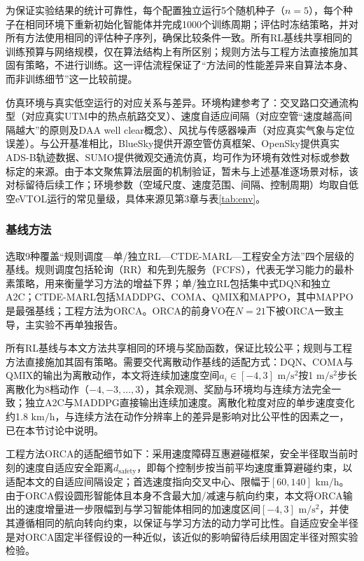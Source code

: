 \documentclass[12pt,a4paper,UTF8]{ctexart}
\begin{document}
为保证实验结果的统计可靠性，每个配置独立运行5个随机种子（$n=5$），每个种子在相同环境下重新初始化智能体并完成1000个训练周期；评估时冻结策略，并对所有方法使用相同的评估种子序列，确保比较条件一致。所有RL基线共享相同的训练预算与网络规模，仅在算法结构上有所区别；规则方法与工程方法直接施加其固有策略，不进行训练。这一评估流程保证了“方法间的性能差异来自算法本身、而非训练细节”这一比较前提。

仿真环境与真实低空运行的对应关系与差异。环境构建参考了：交叉路口交通流构型（对应真实UTM中的热点航路交叉）、速度自适应间隔（对应空管“速度越高间隔越大”的原则及DAA well clear概念）、风扰与传感器噪声（对应真实气象与定位误差）。与公开基准相比，BlueSky\cite{ref52}提供开源空管仿真框架、OpenSky\cite{ref53}提供真实ADS-B轨迹数据、SUMO\cite{ref54}提供微观交通流仿真，均可作为环境有效性对标或参数标定的来源。由于本文聚焦算法层面的机制验证，暂未与上述基准逐场景对标，该对标留待后续工作；环境参数（空域尺度、速度范围、间隔、控制周期）均取自低空eVTOL运行的常见量级，具体来源见第3章与表\ref{tab:env}。

\subsubsection{基线方法}

选取9种覆盖“规则调度—单/独立RL—CTDE-MARL—工程安全方法”四个层级的基线。规则调度包括轮询（RR）和先到先服务（FCFS），代表无学习能力的最朴素策略，用来衡量学习方法的增益下界；单/独立RL包括集中式DQN和独立A2C；CTDE-MARL包括MADDPG、COMA、QMIX和MAPPO，其中MAPPO是最强基线；工程方法为ORCA\cite{ref4}。ORCA的前身VO在$N=21$下被ORCA一致主导，主实验不再单独报告。

所有RL基线与本文方法共享相同的环境与奖励函数，保证比较公平；规则与工程方法直接施加其固有策略。需要交代离散动作基线的适配方式：DQN、COMA与QMIX的输出为离散动作，本文将连续加速度空间$a_i\in[-4,3]$ $\mathrm{m/s^2}$按1 $\mathrm{m/s^2}$步长离散化为8档动作（$-4,-3,\ldots,3$），其余观测、奖励与环境均与连续方法完全一致；独立A2C与MADDPG直接输出连续加速度。离散化粒度对应的单步速度变化约1.8 $\mathrm{km/h}$，与连续方法在动作分辨率上的差异是影响对比公平性的因素之一，已在本节讨论中说明。

工程方法ORCA的适配细节如下：采用速度障碍互惠避碰框架，安全半径取当前时刻的速度自适应安全距离$d_{\text{safety}}$，即每个控制步按当前平均速度重算避碰约束，以适配本文的自适应间隔设定；首选速度指向交叉中心、限幅于$[60,140]$ $\mathrm{km/h}$。由于ORCA假设圆形智能体且本身不含最大加/减速与航向约束，本文将ORCA输出的速度增量进一步限幅到与学习智能体相同的加速度区间$[-4,3]$ $\mathrm{m/s^2}$，并使其遵循相同的航向转向约束，以保证与学习方法的动力学可比性。自适应安全半径是对ORCA固定半径假设的一种近似，该近似的影响留待后续用固定半径对照实验检验。
\end{document}
